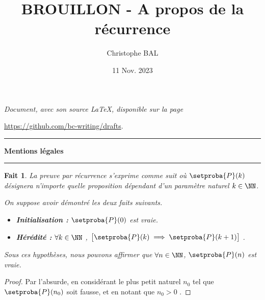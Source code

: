 \documentclass[12pt]{amsart}
\newtheorem{fact}{Fait}[section]
\begin{document}
\title{BROUILLON - A propos de la récurrence}
\author{Christophe BAL}
\date{11 Nov. 2023}

\maketitle

\begin{center}
	\itshape
	Document, avec son source \LaTeX, disponible sur la page

	\url{https://github.com/bc-writing/drafts}.
\end{center}


\bigskip


\begin{center}
	\hrule\vspace{.3em}
	{
		\fontsize{1.35em}{1em}\selectfont
		\textbf{Mentions \og légales \fg}
	}

	\vspace{0.45em}
	\doclicenseThis
	\hrule
\end{center}


\bigskip




\begin{fact} \label{recursivity}
	La preuve par récurrence s'exprime comme suit où $\setproba{P}(k)$ désignera n'importe quelle proposition dépendant d'un paramètre naturel $k \in \NN$.

	\medskip

	On suppose avoir démontré les deux faits suivants.
	
	\begin{itemize}[label=\small\textbullet]
		\item \textbf{Initialisation :}
		      $\setproba{P}(0)$ est vraie.

		\item \textbf{Hérédité :}
		      $\forall k \in \NN$ , $\big[ \setproba{P}(k) \implies \setproba{P}(k+1) \big]$ .
	\end{itemize}

	Sous ces hypothèses, nous pouvons affirmer que $\forall n \in \NN$, $\setproba{P}(n)$ est vraie.
\end{fact}


\begin{proof}
	Par l'absurde, en considérant le plus petit naturel $n_0$ tel que $\setproba{P}(n_0)$ soit fausse, et en notant que $n_0 > 0$ . 
\end{proof}
\end{document}
